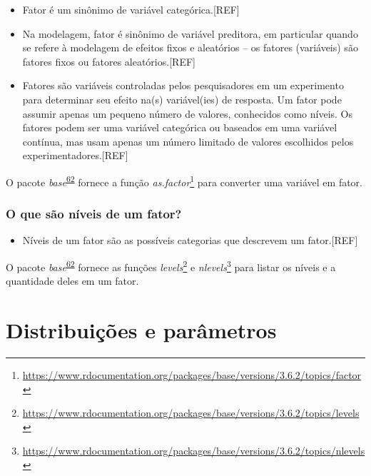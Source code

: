 \documentclass[
  a4paper,
]{book}
\providecommand{\tightlist}{%
  \setlength{\itemsep}{0pt}\setlength{\parskip}{0pt}}
\renewcommand{\href}[2]{#2\footnote{\url{#1}}}
\newenvironment{infobox}[1]
  {
  \begin{itemize}
  \renewcommand{\labelitemi}{
    \raisebox{-.7\height}[0pt][0pt]{
      {\setkeys{Gin}{width=3em,keepaspectratio}
        \texttt{[image: \#1]}}
    }
  }
  \setlength{\fboxsep}{1em}
  \begin{blackbox}
  \item
  }
  {
  \end{blackbox}
  \end{itemize}
  }
\begin{document}
\begin{itemize}
\item
  Fator é um sinônimo de variável categórica.{[}REF{]}
\item
  Na modelagem, fator é sinônimo de variável preditora, em particular quando se refere à modelagem de efeitos fixos e aleatórios -- os fatores (variáveis) são fatores fixos ou fatores aleatórios.{[}REF{]}
\item
  Fatores são variáveis controladas pelos pesquisadores em um experimento para determinar seu efeito na(s) variável(ies) de resposta. Um fator pode assumir apenas um pequeno número de valores, conhecidos como níveis. Os fatores podem ser uma variável categórica ou baseados em uma variável contínua, mas usam apenas um número limitado de valores escolhidos pelos experimentadores.{[}REF{]}
\end{itemize}

\begin{infobox}{images/Rlogo}
O pacote \emph{base}\textsuperscript{\protect\hyperlink{ref-base-2}{62}} fornece a função \href{https://www.rdocumentation.org/packages/base/versions/3.6.2/topics/factor}{\emph{as.factor}} para converter uma variável em fator.

\end{infobox}

\hypertarget{o-que-suxe3o-nuxedveis-de-um-fator}{%
\subsection{O que são níveis de um fator?}\label{o-que-suxe3o-nuxedveis-de-um-fator}}

\begin{itemize}
\tightlist
\item
  Níveis de um fator são as possíveis categorias que descrevem um fator.{[}REF{]}
\end{itemize}

\begin{infobox}{images/Rlogo}
O pacote \emph{base}\textsuperscript{\protect\hyperlink{ref-base-2}{62}} fornece as funções \href{https://www.rdocumentation.org/packages/base/versions/3.6.2/topics/levels}{\emph{levels}} e \href{https://www.rdocumentation.org/packages/base/versions/3.6.2/topics/nlevels}{\emph{nlevels}} para listar os níveis e a quantidade deles em um fator.

\end{infobox}

\hypertarget{distribuicoes-parametros}{%
\chapter{\texorpdfstring{\textbf{Distribuições e parâmetros}}{Distribuições e parâmetros}}\label{distribuicoes-parametros}}
\end{document}
